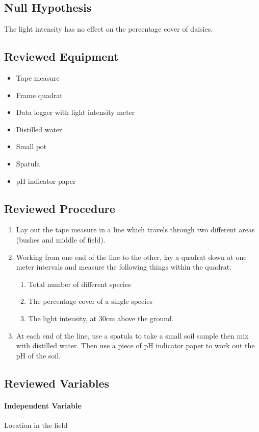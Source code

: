 \documentclass{thomasClass}
\begin{document}
\subsection{Null Hypothesis}
The light intensity has no effect on the percentage cover of daisies.
\subsection{Reviewed Equipment}
\begin{itemize}
    \item Tape measure
    \item Frame quadrat
    \item Data logger with light intensity meter
    \item Distilled water
    \item Small pot
    \item Spatula
    \item pH indicator paper
\end{itemize}
\subsection{Reviewed Procedure}
\begin{enumerate}
    \item Lay out the tape measure in a line which travels through two different areas (bushes and middle of field). 
    \item Working from one end of the line to the other, lay a quadrat down at one meter intervals and measure the following things within the quadrat:
    \begin{enumerate}
        \item Total number of different species
        \item The percentage cover of a single species
        \item The light intensity, at 30cm above the ground.
    \end{enumerate}
    \item At each end of the line, use a spatula to take a small soil sample then mix with distilled water. Then use a piece of pH indicator paper to work out the pH of the soil.
\end{enumerate}
\subsection{Reviewed Variables}
\paragraph{Independent Variable}
Location in the field
\end{document}
